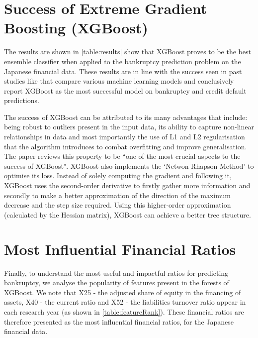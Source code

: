 \section{Success of Extreme Gradient Boosting (XGBoost)}
The results are shown in \autoref{table:results} show that XGBoost proves to be the best ensemble classifier when applied to the bankruptcy prediction problem on the Japanese financial data. These results are in line with the success seen in past studies like \cite{barboza2017machine,le2018cluster} that compare various machine learning models and conclusively report XGBoost as the most successful model on bankruptcy and credit default predictions.


The success of XGBoost can be attributed to its many advantages that include: being robust to outliers present in the input data, its ability to capture non-linear relationships in data and most importantly the use of L1 and L2 regularisation that the algorithm introduces to combat overfitting and improve generalisation. The paper \cite{wang2019xgboost} reviews this property to be ``one of the most crucial aspects to the success of XGBoost". XGBoost also implements the `Netwon-Rhapson Method' to optimise its loss. Instead of solely computing the gradient and following it, XGBoost uses the second-order derivative to firstly gather more information and secondly to make a better approximation of the direction of the maximum decrease and the step size required. Using this higher-order approximation (calculated by the Hessian matrix), XGBoost can achieve a better tree structure.

\section{Most Influential Financial Ratios}
Finally, to understand the most useful and impactful ratios for predicting bankruptcy, we analyse the popularity of features present in the forests of XGBoost. We note that X25 - the adjusted share of equity in the financing of assets, X40 - the current ratio and X52 - the liabilities turnover ratio appear in each research year (as shown in \autoref{table:featureRank}). These financial ratios are therefore presented as the most influential financial ratios, for the Japanese financial data. 
